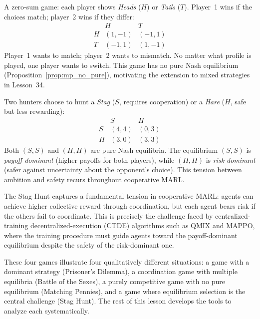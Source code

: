 \documentclass[11pt,a4paper]{article}
\begin{document}
\begin{example}
\label{ex:mp}
A zero-sum game: each player shows \emph{Heads} ($H$) or \emph{Tails} ($T$).
Player~1 wins if the choices match; player~2 wins if they differ:
\[
\begin{array}{c|cc}
    & H & T \\ \hline
  H & (1,-1) & (-1,1) \\
  T & (-1,1) & (1,-1)
\end{array}
\]
Player~1 wants to match; player~2 wants to mismatch.  No matter what
profile is played, one player wants to switch.  This game has no pure Nash
equilibrium (Proposition~\ref{prop:mp_no_pure}), motivating the extension
to mixed strategies in Lesson~34.
\end{example}

\begin{example}
\label{ex:stag}
Two hunters choose to hunt a \emph{Stag} ($S$, requires cooperation) or a
\emph{Hare} ($H$, safe but less rewarding):
\[
\begin{array}{c|cc}
    & S & H \\ \hline
  S & (4,4) & (0,3) \\
  H & (3,0) & (3,3)
\end{array}
\]
Both $(S,S)$ and $(H,H)$ are pure Nash equilibria.  The equilibrium $(S,S)$
is \emph{payoff-dominant} (higher payoffs for both players), while $(H,H)$
is \emph{risk-dominant} (safer against uncertainty about the opponent's
choice).  This tension between ambition and safety recurs throughout
cooperative MARL.
\end{example}

\begin{rlconnection}
The Stag Hunt captures a fundamental tension in cooperative MARL: agents can
achieve higher collective reward through coordination, but each agent bears
risk if the others fail to coordinate.  This is precisely the challenge faced
by centralized-training decentralized-execution (CTDE) algorithms such as
QMIX and MAPPO, where the training procedure must guide agents toward the
payoff-dominant equilibrium despite the safety of the risk-dominant one.
\end{rlconnection}

These four games illustrate four qualitatively different situations:
a game with a dominant strategy (Prisoner's Dilemma), a coordination game
with multiple equilibria (Battle of the Sexes), a purely competitive game
with no pure equilibrium (Matching Pennies), and a game where equilibrium
selection is the central challenge (Stag Hunt).  The rest of this lesson
develops the tools to analyze each systematically.
\end{document}
